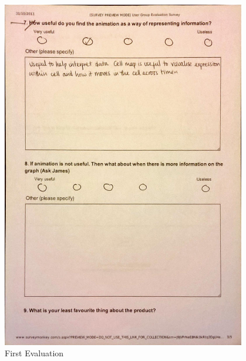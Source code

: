 \begin{figure}[h!]
    \centering
    \includegraphics[width=0.95\textwidth]{images/user_eval/user_eval_3.jpg}
    \caption{First Evaluation}
\end{figure}

